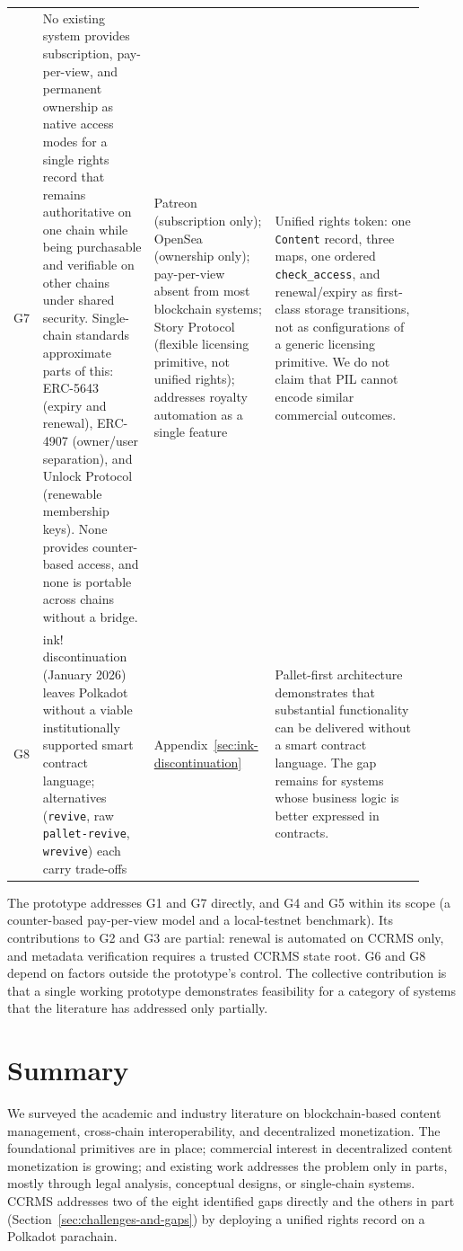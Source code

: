 \begin{longtable}{@{}L{0.04\linewidth} L{0.26\linewidth} L{0.26\linewidth} L{0.35\linewidth}@{}}
\addlinespace
G7 & No existing system provides subscription, pay-per-view, and permanent ownership as native access modes for a single rights record that remains authoritative on one chain while being purchasable and verifiable on other chains under shared security. Single-chain standards approximate parts of this: ERC-5643 \citep{cygaar2022} (expiry and renewal), ERC-4907 \citep{anders2022} (owner/user separation), and Unlock Protocol \citep{unlockProtocol2026} (renewable membership keys). None provides counter-based access, and none is portable across chains without a bridge. & Patreon (subscription only); OpenSea (ownership only); pay-per-view absent from most blockchain systems; Story Protocol (flexible licensing primitive, not unified rights); \citet{shah2025} addresses royalty automation as a single feature & Unified rights token: one \texttt{Content} record, three maps, one ordered \texttt{check\_access}, and renewal/expiry as first-class storage transitions, not as configurations of a generic licensing primitive. We do not claim that PIL cannot encode similar commercial outcomes. \\
\addlinespace
G8 & ink! discontinuation (January 2026) leaves Polkadot without a viable institutionally supported smart contract language; alternatives (\texttt{revive}, raw \texttt{pallet-revive}, \texttt{wrevive}) each carry trade-offs & Appendix~\ref{sec:ink-discontinuation} & Pallet-first architecture demonstrates that substantial functionality can be delivered without a smart contract language. The gap remains for systems whose business logic is better expressed in contracts. \\
\end{longtable}


The prototype addresses G1 and G7 directly, and G4 and G5 within its scope (a counter-based pay-per-view model and a local-testnet benchmark). Its contributions to G2 and G3 are partial: renewal is automated on CCRMS only, and metadata verification requires a trusted CCRMS state root. G6 and G8 depend on factors outside the prototype's control. The collective contribution is that a single working prototype demonstrates feasibility for a category of systems that the literature has addressed only partially.

\section{Summary}\label{sec:chapter-2-summary}

We surveyed the academic and industry literature on blockchain-based content management, cross-chain interoperability, and decentralized monetization. The foundational primitives are in place; commercial interest in decentralized content monetization is growing; and existing work addresses the problem only in parts, mostly through legal analysis, conceptual designs, or single-chain systems. CCRMS addresses two of the eight identified gaps directly and the others in part (Section~\ref{sec:challenges-and-gaps}) by deploying a unified rights record on a Polkadot parachain.

